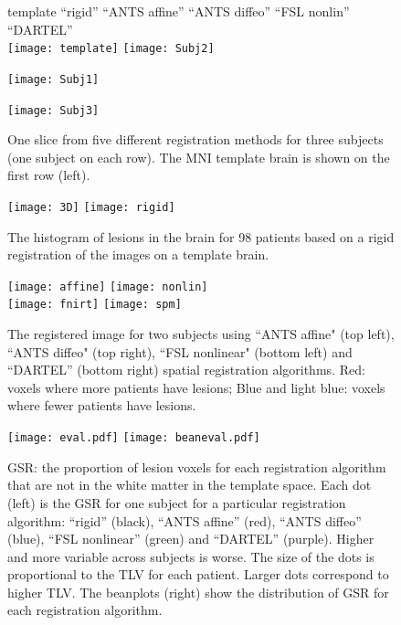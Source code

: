 \documentclass[10pt]{article}
\begin{document}
\begin{figure}[ht!]

template \hspace{0.6in} \small ``rigid''  \hspace{0.4in} \small ``ANTS affine'' \hspace{0.05in} \small ``ANTS diffeo'' \hspace{0.1in}  \small ``FSL nonlin'' \hspace{0.1in} \small ``DARTEL'' \\

\texttt{[image: template]}    \hspace{0.1in}  \texttt{[image: Subj2]}  

  \hspace{1.16in}  \texttt{[image: Subj1]}  

  \hspace{1.16in}  \texttt{[image: Subj3]}  

\caption{One slice from five different registration methods for three subjects (one subject on each row). The MNI template brain is shown on the first row (left). }\label{t:reg}
\end{figure}


\begin{figure}[ht!]
\begin{center}
\texttt{[image: 3D]}
\texttt{[image: rigid]}
\end{center}
\caption{The histogram of lesions in the brain for 98 patients based
on a rigid  registration of the images on a template
brain.}\label{fig:LesHist}
\end{figure}


\begin{figure}[ht!]
\begin{center}
\texttt{[image: affine]}
\texttt{[image: nonlin]} \\
\texttt{[image: fnirt]}
\texttt{[image: spm]}
\end{center}
\caption{The registered image for two subjects using ``ANTS affine"
(top left), ``ANTS diffeo" (top right), ``FSL nonlinear"  (bottom left) and ``DARTEL'' (bottom right)
spatial registration algorithms. Red: voxels where more patients
have lesions; Blue and light blue: voxels where fewer patients have
lesions.}\label{fig:histograms}
\end{figure}


\begin{figure}[ht!]
\begin{center}
\texttt{[image: eval.pdf]}
\texttt{[image: beaneval.pdf]}
\end{center}
\caption{GSR: the proportion of lesion voxels for each registration algorithm that are
not in the white matter in the template space. Each dot (left) is the GSR for one subject for
a particular registration algorithm: ``rigid'' (black), ``ANTS affine'' (red), ``ANTS diffeo''
(blue), ``FSL nonlinear'' (green) and ``DARTEL'' (purple). Higher and more variable across subjects is worse. The size of the dots is proportional to the TLV for each patient. Larger dots correspond to higher TLV. The beanplots (right) show the distribution of GSR for each registration algorithm.}\label{fig:eval}
\end{figure}
\end{document}
